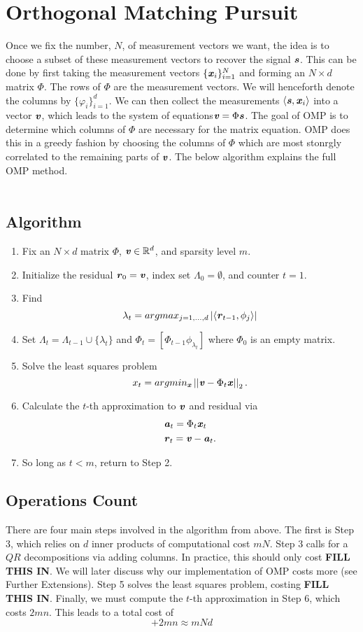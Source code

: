 \documentclass[12pt]{amsart}
\theoremstyle{plain}
\theoremstyle{plain}
\theoremstyle{plain}
\theoremstyle{plain}
\theoremstyle{plain}
\theoremstyle{plain}
\theoremstyle{plain}
\theoremstyle{plain}
\newcommand{\R}{\mathbb{R}}
\newcommand{\s}{\textbf{\emph{s}}}
\newcommand{\x}{\textbf{\emph{x}}}
\newcommand{\ve}{\textbf{\emph{v}}}
\newcommand{\arr}{\textbf{\emph{r}}}
\newcommand{\ay}{\textbf{\emph{a}}}
\newcommand{\vectornorm}[1]{\left|\left|#1\right|\right|}
\begin{document}
	
\section{Orthogonal Matching Pursuit}


Once we fix the number, $N$, of measurement vectors we want, the idea is to choose a subset of these measurement vectors to recover the signal $\s$.  This can be done by first taking the measurement vectors $\{\x_i\}_{i=1}^N$ and forming an $N\times d$ matrix $\Phi$.  The rows of $\Phi$ are the measurement vectors.  We will henceforth denote the columns by $\{\varphi_i\}_{i=1}^d$.  We can then collect the measurements $\langle \s,\x_i\rangle$ into a vector $\ve$, which leads to the system of equations$\ve=\Phi \s$.  The goal of OMP is to determine which columns of $\Phi$ are necessary for the matrix equation.  OMP does this in a greedy fashion by choosing the columns of $\Phi$ which are most stonrgly correlated to the remaining parts of $\ve$.  The below algorithm explains the full OMP method.\\\\


\subsection{Algorithm}
\begin{enumerate}
	\item Fix an $N\times d$ matrix $\Phi$, $\ve\in\R^d$, and sparsity level $m$.
	\item Initialize the residual $\arr_0=\ve$, index set $\Lambda_0=\emptyset$, and counter $t=1$.
	\item Find 
		$$\lambda_t=argmax_{j=1,\ldots, d} \left|\langle \arr_{t-1},\phi_j\rangle\right|$$
	\item Set $\Lambda_t=\Lambda_{t-1}\cup\{\lambda_t\}$ and $\Phi_t = [\Phi_{t-1} \phi_{\lambda_t}]$ where $\Phi_0$ is an empty matrix.
	\item Solve the least squares problem 
		$$x_t=argmin_\x \vectornorm{\ve-\Phi_t\x}_2.$$
	\item Calculate the $t$-th approximation to $\ve$ and residual via
		\begin{align*}
			&\ay_t=\Phi_t\x_t\\
			&\arr_t=\ve-\ay_t.
		\end{align*}
	\item So long as $t<m$, return to Step 2.
\end{enumerate}

\subsection{Operations Count}
There are four main steps involved in the algorithm from above.  The first is Step 3, which relies on $d$ inner products of computational cost $mN$.  Step 3 calls for a $QR$ decompositions via adding columns.  In practice, this should only cost \textbf{FILL THIS IN}.  We will later discuss why our implementation of OMP costs more (see Further Extensions).  Step 5 solves the least squares problem, costing \textbf{FILL THIS IN}.  Finally, we must compute the $t$-th approximation in Step 6, which costs $2mn$.  This leads to a total cost of
	$$+2mn\approx mNd$$
\end{document}
